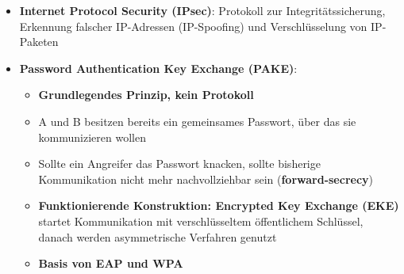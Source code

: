 \begin{itemize}
\begin{itemize}
	\end{itemize}
	\item \textbf{Internet Protocol Security (IPsec)}: Protokoll zur Integritätssicherung, Erkennung falscher IP-Adressen (IP-Spoofing) und Verschlüsselung von IP-Paketen
	\item \textbf{Password Authentication Key Exchange (PAKE)}:
	\begin{itemize}
		\item \textbf{Grundlegendes Prinzip, kein Protokoll}
		\item A und B besitzen bereits ein gemeinsames Passwort, über das sie kommunizieren wollen
		\item Sollte ein Angreifer das Passwort knacken, sollte bisherige Kommunikation nicht mehr nachvollziehbar sein (\textbf{forward-secrecy})
		\item \textbf{Funktionierende Konstruktion: Encrypted Key Exchange (EKE)} startet Kommunikation mit verschlüsseltem öffentlichem Schlüssel, danach werden asymmetrische Verfahren genutzt
		\item \textbf{Basis von EAP und WPA}
	\end{itemize}
\end{itemize}